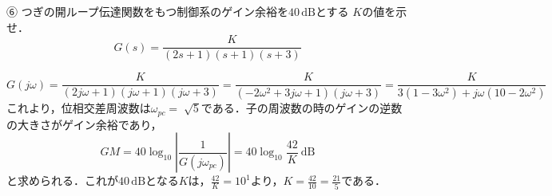 ⑥ つぎの開ループ伝達関数をもつ制御系のゲイン余裕を$40\,\mathrm{dB}$とする
$K$の値を示せ．
$$
G(s)=\frac{K}{(2s+1)(s+1)(s+3)}
$$


$$
G(j \omega)=\frac{K}{(2 j \omega+1)(j \omega+1)(j \omega+3)}=\frac{K}{\left(-2 \omega^2+3 j \omega+1\right)(j \omega+3)}=\frac{K}{3\left(1-3 \omega^2\right)+j \omega\left(10-2 \omega^2\right)}
$$
これより，位相交差周波数は$\omega_{pc}=\sqrt[]{5}$である．子の周波数の時のゲインの逆数の大きさがゲイン余裕であり，
$$
GM=40 \log _{10}\left|\frac{1}{G\left(j \omega_{p c}\right)}\right|=40 \log _{10} \frac{42}{K} \mathrm{~dB}
$$
と求められる．これが$40\,\mathrm{dB}$となる$K$は，$\frac{42}{K}=10^1$より，$K=\frac{42}{10}=\frac{21}{5}$である．
\newpage
